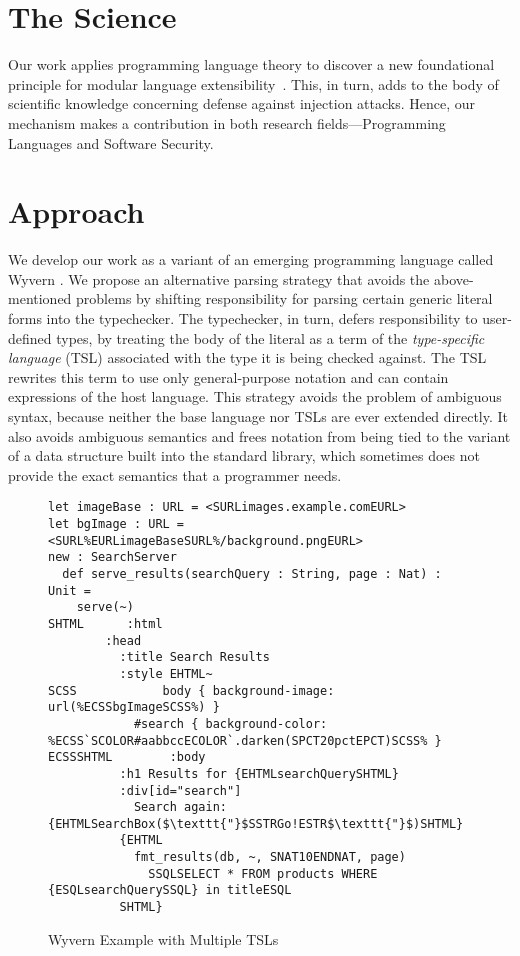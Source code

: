 \documentclass{sig-alternate}
\newcommand{\qs}[1]{}%
\begin{document}
\section{The Science}

Our work applies programming language theory to discover a new foundational principle for modular language extensibility~\cite{tsl14}. This, in turn, adds to the body of scientific knowledge concerning defense against injection attacks. Hence, our mechanism makes a contribution in both research fields---Programming Languages and Software Security.

\section{Approach}
\qs{Describe your approach in attacking the problem and clearly state how your approach is novel.}

We develop our work as a variant of an emerging programming language called Wyvern \cite{Nistor:2013:WST:2489828.2489830}. We propose an alternative parsing strategy that avoids the above-mentioned problems by shifting responsibility for parsing certain generic literal forms into the typechecker. The typechecker, in turn, defers responsibility to user-defined types, by treating the body of the literal as a term of the \emph{type-specific language} (TSL) associated with the type it is being checked against. The TSL rewrites this term to use only general-purpose notation and can contain expressions of the host language. This strategy avoids the problem of ambiguous syntax, because neither the base language nor TSLs are ever extended directly. It also avoids ambiguous semantics and frees notation from being tied to the variant of a  data structure built into the standard library, which sometimes does not provide the exact semantics that a programmer needs.

\begin{figure}[t]
\begin{lstlisting}
let imageBase : URL = <SURLimages.example.comEURL>
let bgImage : URL = <SURL%EURLimageBaseSURL%/background.pngEURL>
new : SearchServer
  def serve_results(searchQuery : String, page : Nat) : Unit =
    serve(~)
SHTML      :html
        :head
          :title Search Results
          :style EHTML~
SCSS            body { background-image: url(%ECSSbgImageSCSS%) }
            #search { background-color: %ECSS`SCOLOR#aabbccECOLOR`.darken(SPCT20pctEPCT)SCSS% }
ECSSSHTML        :body
          :h1 Results for {EHTMLsearchQuerySHTML}
          :div[id="search"]
            Search again: {EHTMLSearchBox($\texttt{"}$SSTRGo!ESTR$\texttt{"}$)SHTML}
          {EHTML
            fmt_results(db, ~, SNAT10ENDNAT, page)
              SSQLSELECT * FROM products WHERE {ESQLsearchQuerySSQL} in titleESQL
          SHTML}
\end{lstlisting}
\caption{Wyvern Example with Multiple TSLs}
\label{f-example}
\vspace{-10px}
\end{figure}
\end{document}
